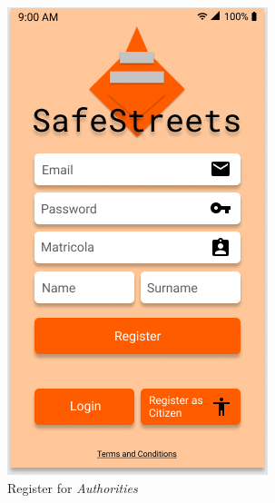 \documentclass{article}
\begin{document}
\begin{figure}[H]
    \begin{subfigure}{0.5\textwidth}
        \includegraphics[width=0.9\linewidth]{img/mockups/register_authority.png} 
        \caption{Register for \textit{Authorities}}
        \label{fig:subim1}
    \end{subfigure}
    \begin{subfigure}{0.5\textwidth}

\end{subfigure}
\end{figure}
\end{document}
